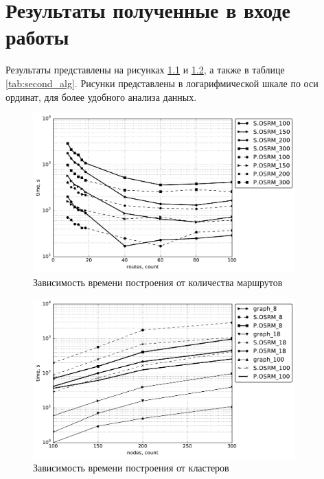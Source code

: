 \documentclass[a4paper, 14pt]{extreport}
\begin{document}
    \chapter{Результаты полученные в входе работы}
    Результаты представлены на рисунках \ref{fig:result-01} и \ref{fig:result-02}, а также в таблице 
    \ref{tab:second_alg}. Рисунки представлены в логарифмической шкале по оси ординат, для более удобного 
    анализа данных.

    \begin{figure}[ht!]
        \centering
        \includegraphics[width=0.9\textwidth]{result-01}
        \caption{Зависимость времени построения от количества маршрутов}
        \label{fig:result-01}
    \end{figure}

    \begin{figure}[ht!]
        \centering
        \includegraphics[width=0.9\textwidth]{result-02}
        \caption{Зависимость времени построения от кластеров}
        \label{fig:result-02}
    \end{figure}
\end{document}
